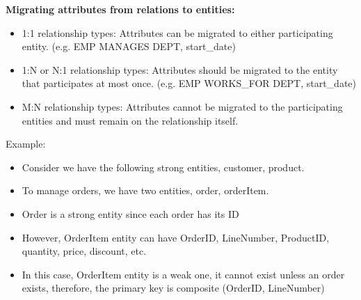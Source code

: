 \documentclass{article}
\begin{document}
\textbf{Migrating attributes from relations to entities:}
\begin{itemize}
    \item 1:1 relationship types: Attributes can be migrated to either participating entity. (e.g. EMP MANAGES DEPT, start\_date)
    \item 1:N or N:1 relationship types: Attributes should be migrated to the entity that participates at most once. (e.g. EMP WORKS\_FOR DEPT, start\_date)
    \item M:N relationship types: Attributes cannot be migrated to the participating entities and must remain on the relationship itself.
\end{itemize}



Example: 
\begin{itemize}
    \item Consider we have the following strong entities, customer, product.
    \item To manage orders, we have two entities, order, orderItem.
    \item Order is a strong entity since each order has its ID
    \item However, OrderItem entity can have OrderID, LineNumber, ProductID, quantity, price, discount, etc.
    \item In this case, OrderItem entity is a weak one, it cannot exist unless an order exists, therefore, the primary key is composite (OrderID, LineNumber)
\end{itemize}

\end{document}
